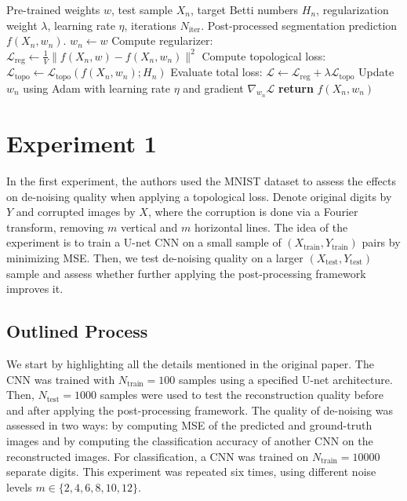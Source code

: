 \begin{algorithm}[H]
\caption{Topological Post-Processing Framework}
\label{alg:topo_post_processing}
\begin{algorithmic}[1]
\Require Pre-trained weights $w$, test sample $X_n$, target Betti numbers $H_n$, regularization weight $\lambda$, learning rate $\eta$, iterations $N_\text{iter}$.
\Ensure Post-processed segmentation prediction $f(X_n, w_n)$.
\State $w_n \gets w$ 
    \State Compute regularizer: $\mathcal{L}_{\text{reg}} \gets \frac{1}{V} \|f(X_n, w) - f(X_n, w_n)\|^2$
    \State Compute topological loss: $\mathcal{L}_{\text{topo}} \gets \mathcal{L}_{\text{topo}}(f(X_n, w_n); H_n)$
    \State Evaluate total loss: $\mathcal{L} \gets \mathcal{L}_{\text{reg}} + \lambda \mathcal{L}_{\text{topo}}$
    \State Update $w_n$ using Adam with learning rate $\eta$ and gradient $\nabla_{w_n}\mathcal{L}$
\EndFor
\State \textbf{return} $f(X_n, w_n)$
\end{algorithmic}
\end{algorithm}


\section{Experiment 1}

In the first experiment, the authors used the MNIST dataset to assess the effects on de-noising quality when applying a topological loss. Denote original digits by $Y$ and corrupted images by $X$, where the corruption is done via a Fourier transform, removing $m$ vertical and $m$ horizontal lines. The idea of the experiment is to train a U-net CNN\supercite{Ronneberger:2015} on a small sample of $(X_\text{train}, Y_\text{train})$ pairs by minimizing MSE. Then, we test de-noising quality on a larger $(X_\text{test}, Y_\text{test})$ sample and assess whether further applying the post-processing framework improves it.

\subsection{Outlined Process}

We start by highlighting all the details mentioned in the original paper. The CNN was trained with $N_\text{train}=100$ samples using a specified U-net architecture. Then, $N_\text{test}=1000$ samples were used to test the reconstruction quality before and after applying the post-processing framework. The quality of de-noising was assessed in two ways: by computing MSE of the predicted and ground-truth images and by computing the classification accuracy of another CNN on the reconstructed images. For classification, a CNN was trained on $N_\text{train}=10000$ separate digits. This experiment was repeated six times, using different noise levels $m\in \{ 2,4,6,8,10,12 \}$. \\

